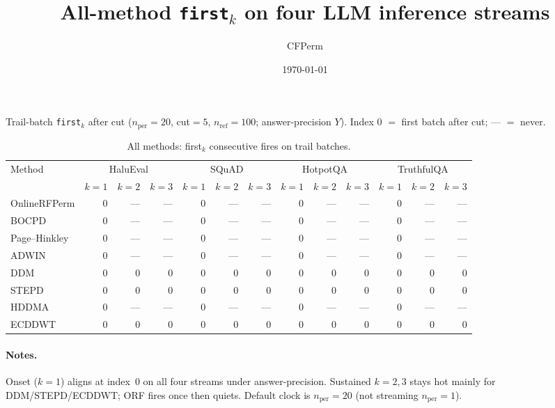 \documentclass[11pt]{article}
\title{All-method \texttt{first}$_k$ on four LLM inference streams}
\author{CFPerm}
\date{\today}
\begin{document}
\maketitle

\noindent
Trail-batch \texttt{first}$_k$ after cut
($n_{\mathrm{per}}=20$, cut$=5$, $n_{\mathrm{ref}}=100$; answer-precision $Y$).
Index $0$ $=$ first batch after cut; --- $=$ never.

\begin{table}[h]
\centering
\small
\caption{All methods: first$_k$ consecutive fires on trail batches.}
\begin{tabular}{lrrrrrrrrrrrr}
\toprule
Method & \multicolumn{3}{c}{HaluEval} & \multicolumn{3}{c}{SQuAD}
 & \multicolumn{3}{c}{HotpotQA} & \multicolumn{3}{c}{TruthfulQA} \\
\cmidrule(lr){2-4} \cmidrule(lr){5-7} \cmidrule(lr){8-10} \cmidrule(lr){11-13}
 & $k{=}1$ & $k{=}2$ & $k{=}3$ & $k{=}1$ & $k{=}2$ & $k{=}3$
 & $k{=}1$ & $k{=}2$ & $k{=}3$ & $k{=}1$ & $k{=}2$ & $k{=}3$ \\
\midrule
OnlineRFPerm & 0 & --- & --- & 0 & --- & --- & 0 & --- & --- & 0 & --- & --- \\
BOCPD        & 0 & --- & --- & 0 & --- & --- & 0 & --- & --- & 0 & --- & --- \\
Page--Hinkley& 0 & --- & --- & 0 & --- & --- & 0 & --- & --- & 0 & --- & --- \\
ADWIN        & 0 & --- & --- & 0 & --- & --- & 0 & --- & --- & 0 & --- & --- \\
DDM          & 0 & 0   & 0   & 0 & 0   & 0   & 0 & 0   & 0   & 0 & 0   & 0   \\
STEPD        & 0 & 0   & 0   & 0 & 0   & 0   & 0 & 0   & 0   & 0 & 0   & 0   \\
HDDMA        & 0 & --- & --- & 0 & --- & --- & 0 & --- & --- & 0 & --- & --- \\
ECDDWT       & 0 & 0   & 0   & 0 & 0   & 0   & 0 & 0   & 0   & 0 & 0   & 0   \\
\bottomrule
\end{tabular}
\end{table}

\paragraph{Notes.}
Onset ($k{=}1$) aligns at index~$0$ on all four streams under answer-precision.
Sustained $k{=}2,3$ stays hot mainly for DDM/STEPD/ECDDWT; ORF fires once then
quiets. Default clock is $n_{\mathrm{per}}=20$ (not streaming $n_{\mathrm{per}}=1$).
\end{document}
